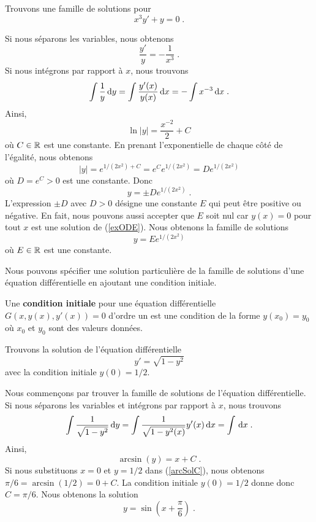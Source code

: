 {\begin{egg}
Trouvons une famille de solutions pour
\begin{equation}\label{exODE}
x^3 y' + y = 0 \; .
\end{equation}

Si nous séparons les variables, nous obtenons
\[
\frac{y'}{y} = -\frac{1}{x^3} \; .
\]
Si nous intégrons par rapport à $x$, nous trouvons
\[
\int \frac{1}{y} \,\mathrm{d}y = \int \frac{y'(x)}{y(x)} \,\mathrm{d}x
= - \int x^{-3} \,\mathrm{d}x \; .
\]
Ainsi,
\[
\ln|y| = \frac{x^{-2}}{2} + C
\]
où $C \in \mathbb{R}$ est une constante.  En prenant l'exponentielle de
chaque côté de l'égalité, nous obtenons
\[
|y| = e^{1/(2x^2) + C} = e^C e^{1/(2x^2)} = D e^{1/(2x^2)}
\]
où $D=e^C > 0$ est une constante.  Donc
\[
y = \pm D e^{1/(2x^2)} \; .
\]
L'expression $\pm D$ avec $D>0$ désigne une constante $E$ qui peut
être positive ou négative.  En fait, nous pouvons aussi accepter que $E$
soit nul car $y(x) = 0$ pour tout $x$ est une solution de
(\ref{exODE}).  Nous obtenons la famille de solutions
\[
y = E e^{1/(2x^2)}
\]
où $E\in \mathbb{R}$ est une constante.
\end{egg}

Nous pouvons spécifier une solution particulière de la famille de solutions
d'une équation différentielle en ajoutant une condition initiale.

\begin{focus}{\dfn} 
Une {\bfseries condition initiale} pour une équation différentielle
$G(x,y(x),y'(x))=0$ d'ordre un est une condition de la forme
$y(x_0)=y_0$ où $x_0$ et $y_0$ sont des valeurs données.
\end{focus}

\begin{egg}
Trouvons la solution de l'équation différentielle
\[
y'= \sqrt{1-y^2}
\]
avec la condition initiale $y(0) = 1/2$.

Nous commençons par trouver la famille de solutions de l'équation
différentielle. Si nous séparons les variables et intégrons par rapport à
$x$, nous trouvons
\[
\int \frac{1}{\sqrt{1-y^2}} \,\mathrm{d}y
= \int \frac{1}{\sqrt{1-y^2(x)}} y'(x) \,\mathrm{d}x = \int \,\mathrm{d}x \; .
\]
Ainsi,
\begin{equation}\label{arcSolC}
\arcsin(y) = x + C \; .
\end{equation}
Si nous substituons $x=0$ et $y=1/2$ dans (\ref{arcSolC}), nous obtenons
$\pi/6 = \arcsin(1/2) = 0 + C$.  La condition initiale $y(0)= 1/2$
donne donc $C=\pi/6$.  Nous obtenons la solution
\[
y = \sin\left(x+\frac{\pi}{6}\right) \; .
\]
\end{egg}

}
